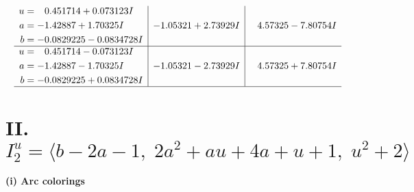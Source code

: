 \documentclass[1p]{elsarticle_modified}
\theoremstyle{definition}
\begin{document}
$$\begin{array}{c|c|c}
\begin{aligned}
u &= \phantom{-}0.451714 + 0.073123 I \\
a &= -1.42887 + 1.70325 I \\
b &= -0.0829225 - 0.0834728 I\end{aligned}
 & -1.05321 + 2.73929 I & \phantom{-}4.57325 - 7.80754 I \\ \hline\begin{aligned}
u &= \phantom{-}0.451714 - 0.073123 I \\
a &= -1.42887 - 1.70325 I \\
b &= -0.0829225 + 0.0834728 I\end{aligned}
 & -1.05321 - 2.73929 I & \phantom{-}4.57325 + 7.80754 I\\
 \hline 
 \end{array}$$\newpage\newpage\renewcommand{\arraystretch}{1}
\centering \section*{II. $I^u_{2}= \langle b-2 a-1,\;2 a^2+a u+4 a+u+1,\;u^2+2 \rangle$}
\flushleft \textbf{(i) Arc colorings}\\
\end{document}

